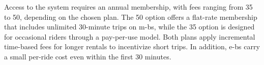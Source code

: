 Access to the system requires an annual membership, with fees ranging from 35 to 50\texteuro, depending on the chosen plan. The 50\texteuro{} option offers a flat-rate membership that includes unlimited 30-minute trips on \acp{m-b}, while the 35\texteuro{} option is designed for occasional riders through a pay-per-use model. Both plans apply incremental time-based fees for longer rentals to incentivize short trips. In addition, \acp{e-b} carry a small per-ride cost even within the first 30 minutes.









